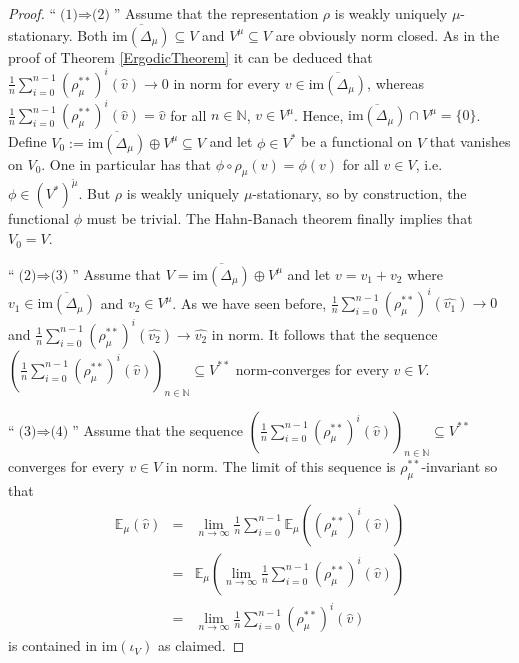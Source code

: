 \documentclass[a4paper,11pt,reqno]{amsart}
\numberwithin{equation}{section}
\theoremstyle{definition}
\theoremstyle{remark}
\theoremstyle{remark}
\begin{document}
\begin{proof} ``$\text{(1)}\Rightarrow\text{(2)}$'' Assume that the representation $\rho$ is weakly uniquely $\mu$-stationary. Both $\overline{\text{im}(\Delta_{\mu})}\subseteq V$ and $V^{\mu}\subseteq V$ are obviously norm closed. As in the proof of Theorem \ref{ErgodicTheorem} it can be deduced that $\frac{1}{n}\sum_{i=0}^{n-1}(\rho_{\mu}^{\ast\ast})^{i}(\widehat{v})\rightarrow0$ in norm for every $v\in\overline{\text{im}(\Delta_{\mu})}$, whereas $\frac{1}{n}\sum_{i=0}^{n-1}(\rho_{\mu}^{\ast\ast})^{i}(\widehat{v})=\widehat{v}$ for all $n\in\mathbb{N}$, $v\in V^{\mu}$. Hence, $\overline{\text{im}(\Delta_{\mu})}\cap V^{\mu}=\{0\}$. Define $V_{0}:=\overline{\text{im}(\Delta_{\mu})}\oplus V^{\mu}\subseteq V$ and let $\phi\in V^{\ast}$ be a functional on $V$ that vanishes on $V_{0}$. One in particular has that $\phi\circ\rho_{\mu}(v)=\phi(v)$ for all $v\in V$, i.e. $\phi\in(V^{\ast})^{\breve{\mu}}$. But $\rho$ is weakly uniquely $\mu$-stationary, so by construction, the functional $\phi$ must be trivial. The Hahn-Banach theorem finally implies that $V_{0}=V$.

``$\text{(2)}\Rightarrow\text{(3)}$'' Assume that $V=\overline{\text{im}(\Delta_{\mu})}\oplus V^{\mu}$ and let $v=v_{1}+v_{2}$ where $v_{1}\in\overline{\text{im}(\Delta_{\mu})}$ and $v_{2}\in V^{\mu}$. As we have seen before, $\frac{1}{n}\sum_{i=0}^{n-1}(\rho_{\mu}^{\ast\ast})^{i}(\widehat{v_{1}})\rightarrow0$ and $\frac{1}{n}\sum_{i=0}^{n-1}(\rho_{\mu}^{\ast\ast})^{i}(\widehat{v_{2}})\rightarrow\widehat{v_{2}}$ in norm. It follows that the sequence $\left(\frac{1}{n}\sum_{i=0}^{n-1}(\rho_{\mu}^{\ast\ast})^{i}(\widehat{v})\right)_{n\in\mathbb{N}}\subseteq V^{\ast\ast}$ norm-converges for every $v\in V$.

``$\text{(3)}\Rightarrow\text{(4)}$'' Assume that the sequence $\left(\frac{1}{n}\sum_{i=0}^{n-1}(\rho_{\mu}^{\ast\ast})^{i}(\widehat{v})\right)_{n\in\mathbb{N}}\subseteq V^{\ast\ast}$ converges for every $v\in V$ in norm. The limit of this sequence is $\rho_{\mu}^{\ast\ast}$-invariant so that 
\begin{eqnarray*}
\mathbb{E}_{\mu}(\widehat{v}) & = & \lim_{n\rightarrow\infty}\frac{1}{n}\sum_{i=0}^{n-1}\mathbb{E}_{\mu}\left((\rho_{\mu}^{\ast\ast})^{i}(\widehat{v})\right)\\
 & = & \mathbb{E}_{\mu}\left(\lim_{n\rightarrow\infty}\frac{1}{n}\sum_{i=0}^{n-1}(\rho_{\mu}^{\ast\ast})^{i}(\widehat{v})\right)\\
 & = & \lim_{n\rightarrow\infty}\frac{1}{n}\sum_{i=0}^{n-1}(\rho_{\mu}^{\ast\ast})^{i}(\widehat{v})\,
\end{eqnarray*}
is contained in $\text{im}(\iota_{V})$ as claimed.


\end{proof}
\end{document}
